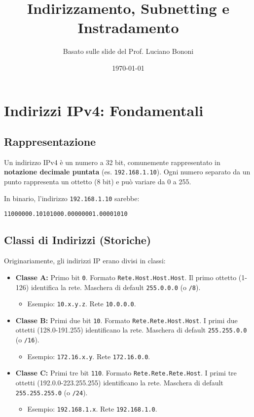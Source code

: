 

\title{Indirizzamento, Subnetting e Instradamento}
\author{Basato sulle slide del Prof. Luciano Bononi}
\date{\today}



\maketitle
\tableofcontents
\newpage

\section{Indirizzi IPv4: Fondamentali}

\subsection{Rappresentazione}
Un indirizzo IPv4 è un numero a 32 bit, comunemente rappresentato in \textbf{notazione decimale puntata} (es. \texttt{192.168.1.10}). Ogni numero separato da un punto rappresenta un ottetto (8 bit) e può variare da 0 a 255.

In binario, l'indirizzo \texttt{192.168.1.10} sarebbe:
\begin{verbatim}
11000000.10101000.00000001.00001010
\end{verbatim}

\subsection{Classi di Indirizzi (Storiche)}
Originariamente, gli indirizzi IP erano divisi in classi:
\begin{itemize}
    \item \textbf{Classe A:} Primo bit \texttt{0}. Formato \texttt{Rete.Host.Host.Host}. Il primo ottetto (1-126) identifica la rete. Maschera di default \texttt{255.0.0.0} (o \texttt{/8}).
    \begin{itemize}
        \item Esempio: \texttt{10.x.y.z}. Rete \texttt{10.0.0.0}.
    \end{itemize}
    \item \textbf{Classe B:} Primi due bit \texttt{10}. Formato \texttt{Rete.Rete.Host.Host}. I primi due ottetti (128.0-191.255) identificano la rete. Maschera di default \texttt{255.255.0.0} (o \texttt{/16}).
    \begin{itemize}
        \item Esempio: \texttt{172.16.x.y}. Rete \texttt{172.16.0.0}.
    \end{itemize}
    \item \textbf{Classe C:} Primi tre bit \texttt{110}. Formato \texttt{Rete.Rete.Rete.Host}. I primi tre ottetti (192.0.0-223.255.255) identificano la rete. Maschera di default \texttt{255.255.255.0} (o \texttt{/24}).
    \begin{itemize}
        \item Esempio: \texttt{192.168.1.x}. Rete \texttt{192.168.1.0}.
    \end{itemize}
\end{itemize}

